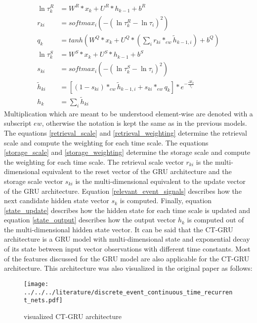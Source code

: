 \documentclass[draft,final]{vutinfth} %
\begin{document}
    \begin{align}
    \label{retrieval_scale}
    \ln{\tau_k^R} &= W^R*x_k + U^R*h_{k-1} + b^R \\
    \label{retrieval_weighting}
    r_{ki} &= softmax_i(-(\ln{\tau_k^R-\ln{\tau_i}})^2) \\
    \label{relevant_event_signals}
    q_k &= tanh(W^Q*x_k + U^Q*(\sum_i {r_{ki} *_{ew} \tilde{h}_{k-1,i}}) + b^Q) \\
    \label{storage_scale}
    \ln{\tau_k^S} &= W^S*x_k + U^S*h_{k-1} + b^S \\
    \label{storage_weighting}
    s_{ki} &= softmax_i(-(\ln{\tau_k^S-\ln{\tau_i}})^2) \\
    \label{state_update}
    \tilde{h}_{ki} &= [(1 - s_{ki}) *_{ew} \tilde{h}_{k-1,i} + s_{ki} *_{ew} q_k] * e^{-\frac{\Delta t_k}{\tau_i}} \\
    \label{state_output}
    h_k &= \sum_i{\tilde{h}_{ki}}
    \end{align}
    Multiplication which are meant to be understood element-wise are denoted with a subscript $ew$, otherwise the notation is kept the same as in the previous models.
    The equations \ref{retrieval_scale} and \ref{retrieval_weighting} determine the retrieval scale and compute the weighting for each time scale.
    The equations \ref{storage_scale} and \ref{storage_weighting} determine the storage scale and compute the weighting for each time scale.
    The retrieval scale vector $r_{ki}$ is the multi-dimensional equivalent to the reset vector of the GRU architecture and the storage scale vector $s_{ki}$ is the multi-dimensional equivalent to the update vector of the GRU architecture.
    Equation \ref{relevant_event_signals} describes how the next candidate hidden state vector $s_k$ is computed.
    Finally, equation \ref{state_update} describes how the hidden state for each time scale is updated and equation \ref{state_output} describes how the output vector $h_k$ is computed out of the multi-dimensional hidden state vector.
    It can be said that the CT-GRU architecture is a GRU model with multi-dimensional state and exponential decay of its state between input vector observations with different time constants.
    Most of the features discussed for the GRU model are also applicable for the CT-GRU architecture.
    This architecture was also visualized in the original paper as follows:
    \begin{figure}[H]
        \centering{}
        \texttt{[image: ../../../literature/discrete\_event\_continuous\_time\_recurrent\_nets.pdf]}
        \caption{visualized CT-GRU architecture \cite[p. 4]{CTGRU}}
        \label{fig:ct_gru_vis}
    \end{figure}
\end{document}
